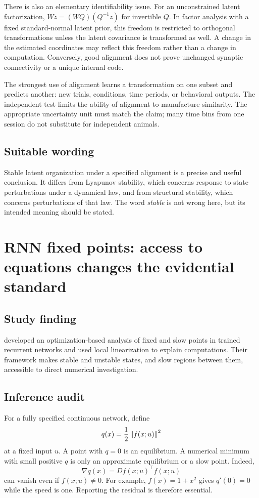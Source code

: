 There is also an elementary identifiability issue. For an unconstrained latent factorization, \(Wz=(WQ)(Q^{-1}z)\) for invertible \(Q\). In factor analysis with a fixed standard-normal latent prior, this freedom is restricted to orthogonal transformations unless the latent covariance is transformed as well. A change in the estimated coordinates may reflect this freedom rather than a change in computation. Conversely, good alignment does not prove unchanged synaptic connectivity or a unique internal code.

The strongest use of alignment learns a transformation on one subset and predicts another: new trials, conditions, time periods, or behavioral outputs. The independent test limits the ability of alignment to manufacture similarity. The appropriate uncertainty unit must match the claim; many time bins from one session do not substitute for independent animals.

\subsection{Suitable wording}
Stable latent organization under a specified alignment is a precise and useful conclusion. It differs from Lyapunov stability, which concerns response to state perturbations under a dynamical law, and from structural stability, which concerns perturbations of that law. The word \emph{stable} is not wrong here, but its intended meaning should be stated.

\section{RNN fixed points: access to equations changes the evidential standard}
\subsection{Study finding}
\citet{app_sussillo2013} developed an optimization-based analysis of fixed and slow points in trained recurrent networks and used local linearization to explain computations. Their framework makes stable and unstable states, and slow regions between them, accessible to direct numerical investigation.

\subsection{Inference audit}
For a fully specified continuous network, define
\[
q(x)=\frac12\left\lVert f(x;u)\right\rVert^2
\]
at a fixed input \(u\). A point with \(q=0\) is an equilibrium. A numerical minimum with small positive \(q\) is only an approximate equilibrium or a slow point. Indeed,
\[
\nabla q(x)=Df(x;u)^\top f(x;u)
\]
can vanish even if \(f(x;u)\ne0\). For example, \(f(x)=1+x^2\) gives \(q'(0)=0\) while the speed is one. Reporting the residual is therefore essential.

